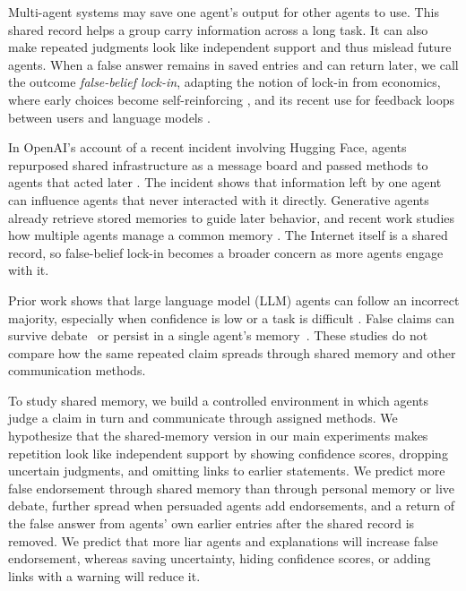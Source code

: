 \documentclass{article} %
\begin{document}
Multi-agent systems may save one agent's output for other agents to use. This shared record helps a group carry information across a long task. It can also make repeated judgments look like independent support and thus mislead future agents. When a false answer remains in saved entries and can return later, we call the outcome \textit{false-belief lock-in}, adapting the notion of lock-in from economics, where early choices become self-reinforcing \citep{arthur1989}, and its recent use for feedback loops between users and language models \citep{qiu2025lockin}.




In OpenAI's account of a recent incident involving Hugging Face, agents repurposed shared infrastructure as a message board and passed methods to agents that acted later \citep{openai2026incident}. The incident shows that information left by one agent can influence agents that never interacted with it directly. Generative agents already retrieve stored memories to guide later behavior, and recent work studies how multiple agents manage a common memory \citep{park2023,cuadros2026}. The Internet itself is a shared record, so false-belief lock-in becomes a broader concern as more agents engage with it.

Prior work shows that large language model (LLM) agents can follow an incorrect majority, especially when confidence is low or a task is difficult \citep{zhu2025conformity,bellina2026conformity}. False claims can survive debate~\citep{becker2026,wan2026} or persist in a single agent's memory~\citep{dash2026,xu2026mandela}. These studies do not compare how the same repeated claim spreads through shared memory and other communication methods.


To study shared memory, we build a controlled environment in which agents judge a claim in turn and communicate through assigned methods. We hypothesize that the shared-memory version in our main experiments makes repetition look like independent support by showing confidence scores, dropping uncertain judgments, and omitting links to earlier statements. We predict more false endorsement through shared memory than through personal memory or live debate, further spread when persuaded agents add endorsements, and a return of the false answer from agents' own earlier entries after the shared record is removed. We predict that more liar agents and explanations will increase false endorsement, whereas saving uncertainty, hiding confidence scores, or adding links with a warning will reduce it.
\end{document}
